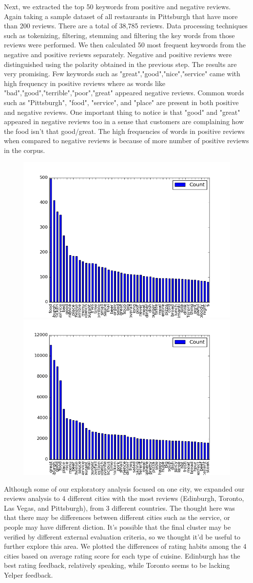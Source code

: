 \documentclass{neu_handout}
\begin{document}
Next, we extracted the top 50 keywords from positive and negative reviews. Again taking a sample dataset of all restaurants in Pittsburgh that have more than 200 reviews. There are a total of 38,785 reviews. Data processing techniques such as tokenizing, filtering, stemming and filtering the key words from those reviews were performed. We then calculated 50 most frequent keywords from the negative and positive reviews separately. Negative and positive reviews were distinguished using the polarity obtained in the previous step.
The results are very promising. Few keywords such as "great","good","nice","service" came with high frequency in positive reviews where as words like "bad","good","terrible","poor","great" appeared negative reviews. Common words such as "Pittsburgh", "food", "service", and "place" are present in both positive and negative reviews. One important thing to notice is that "good" and "great" appeared in negative reviews too in a sense that customers are complaining how the food isn't that good/great. The high frequencies of words in positive reviews when compared to negative reviews is because of more number of positive reviews in the corpus.

\begin{figure}[h]
\centering
{
\includegraphics[width=0.4\linewidth]{top50_negativereviews}
}
{
\includegraphics[width=0.4\linewidth]{top50_positivereviews}
}
\end{figure}

Although some of our exploratory analysis focused on one city, we expanded our reviews analysis to 4 different cities with the most reviews (Edinburgh, Toronto, Las Vegas, and Pittsburgh), from 3 different countries. The thought here was that there may be differences between different cities such as the service, or people may have different diction. It's possible that the final cluster may be verified by different external evaluation criteria, so we thought it'd be useful to further explore this area. We plotted the differences of rating habits among the 4 cities based on average rating score for each type of cuisine. Edinburgh has the best rating feedback, relatively speaking, while Toronto seems to be lacking Yelper feedback.
\end{document}
